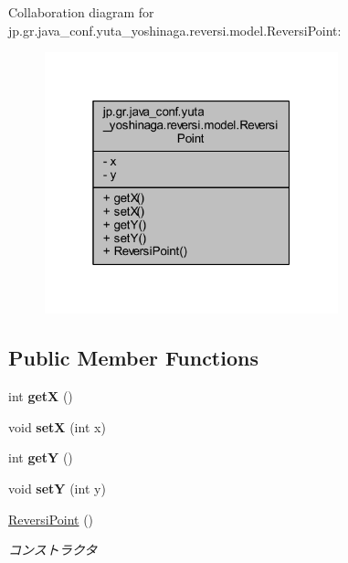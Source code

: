 Collaboration diagram for jp.\+gr.\+java\+\_\+conf.\+yuta\+\_\+yoshinaga.\+reversi.\+model.\+Reversi\+Point\+:\nopagebreak
\begin{figure}[H]
\begin{center}
\leavevmode
\includegraphics[width=241pt]{classjp_1_1gr_1_1java__conf_1_1yuta__yoshinaga_1_1reversi_1_1model_1_1_reversi_point__coll__graph}
\end{center}
\end{figure}
\subsection*{Public Member Functions}
\begin{DoxyCompactItemize}
\item 
\mbox{\label{classjp_1_1gr_1_1java__conf_1_1yuta__yoshinaga_1_1reversi_1_1model_1_1_reversi_point_a9deacf20cc344a6ce93f5130007520d4}} 
int {\bfseries getX} ()
\item 
\mbox{\label{classjp_1_1gr_1_1java__conf_1_1yuta__yoshinaga_1_1reversi_1_1model_1_1_reversi_point_aa4fc225099dad8c9ca909d498d8a951a}} 
void {\bfseries setX} (int x)
\item 
\mbox{\label{classjp_1_1gr_1_1java__conf_1_1yuta__yoshinaga_1_1reversi_1_1model_1_1_reversi_point_a372b0b4d2fce6bfbebfe2e3255b04363}} 
int {\bfseries getY} ()
\item 
\mbox{\label{classjp_1_1gr_1_1java__conf_1_1yuta__yoshinaga_1_1reversi_1_1model_1_1_reversi_point_a831d47ed878457d9b6eb03dc172cbadc}} 
void {\bfseries setY} (int y)
\item 
\hyperlink{classjp_1_1gr_1_1java__conf_1_1yuta__yoshinaga_1_1reversi_1_1model_1_1_reversi_point_a0d214a37c3858ca54e26cc6d5adb2c0b}{Reversi\+Point} ()
\begin{DoxyCompactList}\small\item\em コンストラクタ \end{DoxyCompactList}\end{DoxyCompactItemize}
